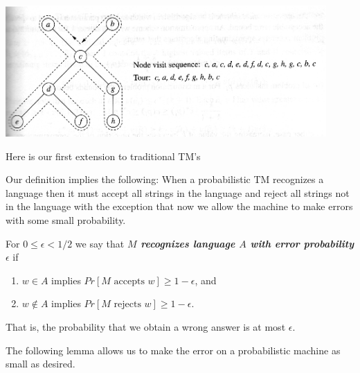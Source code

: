 \documentclass[a4paper,blends,pdf,colorBG,slideColor]{prosper}
\begin{document}
\begin{center}
\includegraphics[height=50mm]{images/tsp.eps}
\end{center}
\es

Here is our first extension to traditional TM's

\es

Our definition implies the following: When a probabilistic TM recognizes a language then it must
accept all strings in the language and reject all strings not in the language with the exception that
now we allow the machine to make errors with some small probability.

For $0 \le \epsilon < 1/2$ we say that {\em\bf $M$ recognizes language $A$ with error probability $\epsilon$} if
\begin{enumerate}
\item $w \in A$ implies $Pr[\text{$M$ accepts $w$}] \ge 1 - \epsilon$, and
\item $w \not\in A$ implies $Pr[\text{$M$ rejects $w$}] \ge 1 - \epsilon$.
\end{enumerate}
That is, the probability that we obtain a wrong answer is at most $\epsilon$.
\es

\small
The following lemma allows us to make the error on a probabilistic machine as small as desired.
\end{document}
